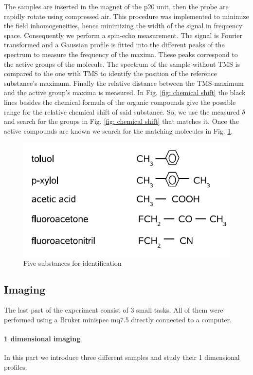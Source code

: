 The samples are inserted in the magnet of the p20 unit, then the probe are rapidly rotate using compressed air. This procedure was implemented to minimize the field inhomogeneities, hence minimizing the width of the signal in frequency space. Consequently we perform a spin-echo measurement. The signal is Fourier transformed and a Gaussian profile is fitted into the different peaks of the spectrum to measure the frequency of the maxima. These peaks correspond to the active groups of the molecule.
The spectrum of the sample without TMS is compared to the one with TMS to identify the position of the reference substance's maximum. Finally the relative distance between the TMS-maximum and the active group's maxima is measured. In Fig. \ref{fig: chemical shift} the black lines besides the chemical formula of the organic compounds give the possible range for the relative chemical shift of said substance. So, we use the measured $\delta$  and search for the groups in Fig. \ref{fig: chemical shift} that matches it. Once the active compounds are known we search for the matching molecules in Fig. \ref{fig: identification}.
\begin{figure}[!htbp]
 \begin{center}
  \includegraphics[width = .6\textwidth]{Latex images/molecules.png}
  \caption[]{Five substances for identification \footnotemark}
    \label{fig: identification}
 \end{center}
\end{figure}
\subsection{Imaging}
The last part of the experiment consist of 3 small tasks. All of them were performed using a Bruker minispec mq7.5 directly connected to a computer.
\paragraph{1 dimensional imaging}
In this part we introduce three different samples and study their 1 dimensional profiles. 
